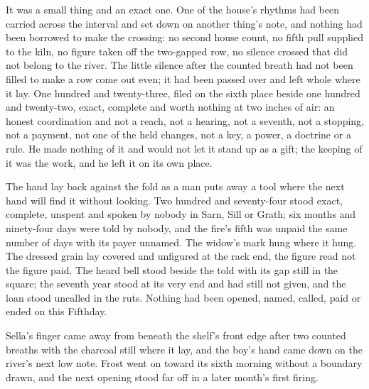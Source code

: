It was a small thing and an exact one. One of the house's rhythms had been carried across the interval and set down on another thing's note, and nothing had been borrowed to make the crossing: no second house count, no fifth pull supplied to the kiln, no figure taken off the two-gapped row, no silence crossed that did not belong to the river. The little silence after the counted breath had not been filled to make a row come out even; it had been passed over and left whole where it lay. One hundred and twenty-three, filed on the sixth place beside one hundred and twenty-two, exact, complete and worth nothing at two inches of air: an honest coordination and not a reach, not a hearing, not a seventh, not a stopping, not a payment, not one of the held changes, not a key, a power, a doctrine or a rule. He made nothing of it and would not let it stand up as a gift; the keeping of it was the work, and he left it on its own place.

The hand lay back against the fold as a man puts away a tool where the next hand will find it without looking. Two hundred and seventy-four stood exact, complete, unspent and spoken by nobody in Sarn, Sill or Grath; six months and ninety-four days were told by nobody, and the fire's fifth was unpaid the same number of days with its payer unnamed. The widow's mark hung where it hung. The dressed grain lay covered and unfigured at the rack end, the figure read not the figure paid. The heard bell stood beside the told with its gap still in the square; the seventh year stood at its very end and had still not given, and the loan stood uncalled in the ruts. Nothing had been opened, named, called, paid or ended on this Fifthday.

Sella's finger came away from beneath the shelf's front edge after two counted breaths with the charcoal still where it lay, and the boy's hand came down on the river's next low note. Frost went on toward its sixth morning without a boundary drawn, and the next opening stood far off in a later month's first firing.

